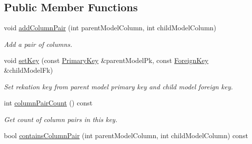 \subsection*{Public Member Functions}
\begin{DoxyCompactItemize}
\item 
void \hyperlink{class_mdt_1_1_item_model_1_1_relation_key_a57579edb6b0962eba3fd32723a297319}{add\+Column\+Pair} (int parent\+Model\+Column, int child\+Model\+Column)
\begin{DoxyCompactList}\small\item\em Add a pair of columns. \end{DoxyCompactList}\item 
void \hyperlink{class_mdt_1_1_item_model_1_1_relation_key_aa65daa433abfdf0a87c801ebf22c84e0}{set\+Key} (const \hyperlink{class_mdt_1_1_item_model_1_1_primary_key}{Primary\+Key} \&parent\+Model\+Pk, const \hyperlink{class_mdt_1_1_item_model_1_1_foreign_key}{Foreign\+Key} \&child\+Model\+Fk)
\begin{DoxyCompactList}\small\item\em Set rekation key from parent model primary key and child model foreign key. \end{DoxyCompactList}\item 
int \hyperlink{class_mdt_1_1_item_model_1_1_relation_key_aea1f1830063a1e645985d68643963614}{column\+Pair\+Count} () const \hypertarget{class_mdt_1_1_item_model_1_1_relation_key_aea1f1830063a1e645985d68643963614}{}\label{class_mdt_1_1_item_model_1_1_relation_key_aea1f1830063a1e645985d68643963614}

\begin{DoxyCompactList}\small\item\em Get count of column pairs in this key. \end{DoxyCompactList}\item 
bool \hyperlink{class_mdt_1_1_item_model_1_1_relation_key_afea43ebff7a2dd9d334a713ed9787799}{contains\+Column\+Pair} (int parent\+Model\+Column, int child\+Model\+Column) const \hypertarget{class_mdt_1_1_item_model_1_1_relation_key_afea43ebff7a2dd9d334a713ed9787799}{}\label{class_mdt_1_1_item_model_1_1_relation_key_afea43ebff7a2dd9d334a713ed9787799}


\end{DoxyCompactItemize}
